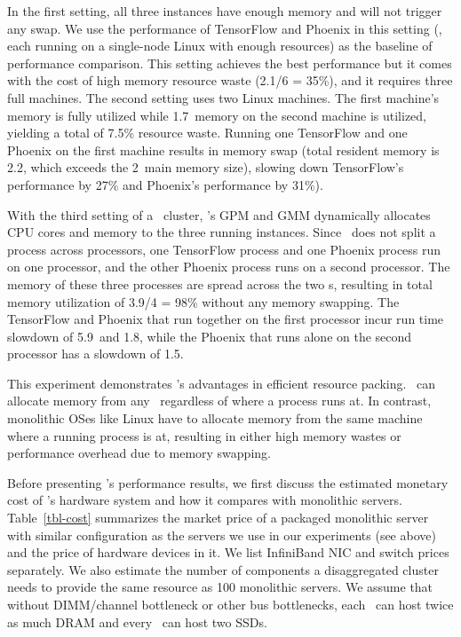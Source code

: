 \documentclass[10pt,times,twocolumn]{z2-article}
\begin{document}
{{{{{{{In the first setting, all three instances have enough memory and will not trigger any swap. 
We use the performance of TensorFlow and Phoenix in this setting (\ie, each running on a single-node Linux with enough resources)
as the baseline of performance comparison.
This setting achieves the best performance but it comes with the cost of high memory resource waste (2.1/6 = 35\%),
and it requires three full machines.
The second setting uses two Linux machines. 
The first machine's memory is fully utilized while 1.7\GB\ memory on the second machine is utilized, yielding a total of 7.5\% resource waste.
Running one TensorFlow and one Phoenix on the first machine results in memory swap (total resident memory is 2.2\GB, which exceeds the 2\GB\ main memory size),
slowing down TensorFlow's performance by 27\% and Phoenix's performance by 31\%).

With the third setting of a \lego\ cluster, \lego's GPM and GMM dynamically allocates CPU cores and memory to 
the three running instances. 
Since \lego\ does not split a process across processors, one TensorFlow process and one Phoenix process
run on one processor, and the other Phoenix process runs on a second processor.
The memory of these three processes are spread across the two \mcomponent s,
resulting in total memory utilization of 3.9/4 = 98\% without any memory swapping.
The TensorFlow and Phoenix that run together on the first processor incur run time slowdown of 
5.9\x\ and 1.8\x, while the Phoenix that runs alone on the second processor has a slowdown of 1.5\x.

This experiment demonstrates \lego's advantages in efficient resource packing.
\lego\ can allocate memory from any \mcomponent\ regardless of where a process runs at.
In contrast, monolithic OSes like Linux have to allocate memory from the same machine where
a running process is at, resulting in either high memory wastes or performance overhead due to memory swapping.

Before presenting \lego's performance results, we first discuss the estimated monetary cost of 
\lego's hardware system and how it compares with monolithic servers.
Table~\ref{tbl-cost} summarizes the market price of a packaged monolithic server 
with similar configuration as the servers we use in our experiments (see above)
and the price of hardware devices in it. 
We list InfiniBand NIC and switch prices separately.
We also estimate the number of components a disaggregated cluster needs to provide the same 
resource as 100 monolithic servers.
We assume that without DIMM/channel bottleneck or other bus bottlenecks, 
each \mcomponent\ can host twice as much DRAM and every \scomponent\ can host two SSDs.

}}}}}}}
\end{document}
